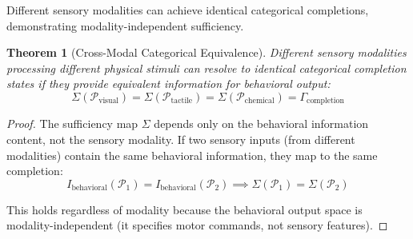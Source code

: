 \documentclass[aps,prd,twocolumn,superscriptaddress,floatfix,nofootinbib]{revtex4-2}
\newtheorem{theorem}{Theorem}[section]
\theoremstyle{remark}
\begin{document}
Different sensory modalities can achieve identical categorical completions, demonstrating modality-independent sufficiency.

\begin{theorem}[Cross-Modal Categorical Equivalence]
\label{thm:crossmodal_equiv}
Different sensory modalities processing different physical stimuli can resolve to identical categorical completion states if they provide equivalent information for behavioral output:
\begin{equation}
\Sigma(\mathcal{P}_{\text{visual}}) = \Sigma(\mathcal{P}_{\text{tactile}}) = \Sigma(\mathcal{P}_{\text{chemical}}) = \Gamma_{\text{completion}}
\end{equation}
\end{theorem}

\begin{proof}
The sufficiency map $\Sigma$ depends only on the behavioral information content, not the sensory modality. If two sensory inputs (from different modalities) contain the same behavioral information, they map to the same completion:
$$
I_{\text{behavioral}}(\mathcal{P}_1) = I_{\text{behavioral}}(\mathcal{P}_2) \implies \Sigma(\mathcal{P}_1) = \Sigma(\mathcal{P}_2)
$$

This holds regardless of modality because the behavioral output space is modality-independent (it specifies motor commands, not sensory features).
\end{proof}
\end{document}
